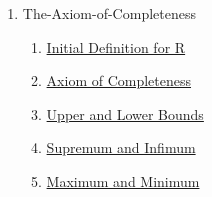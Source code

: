 \clearpage
\renewcommand{\notetitle}{Table of Contents}
\label{toc}
\begin{enumerate}

\item The-Axiom-of-Completeness
\begin{enumerate}
\item \hyperref[202501180703]{Initial Definition for R}
\item \hyperref[202501180727]{Axiom of Completeness}
\item \hyperref[202501180734]{Upper and Lower Bounds}
\item \hyperref[202501180743]{Supremum and Infimum}
\item \hyperref[202501181241]{Maximum and Minimum}
\end{enumerate}
\end{enumerate}

\newpage
